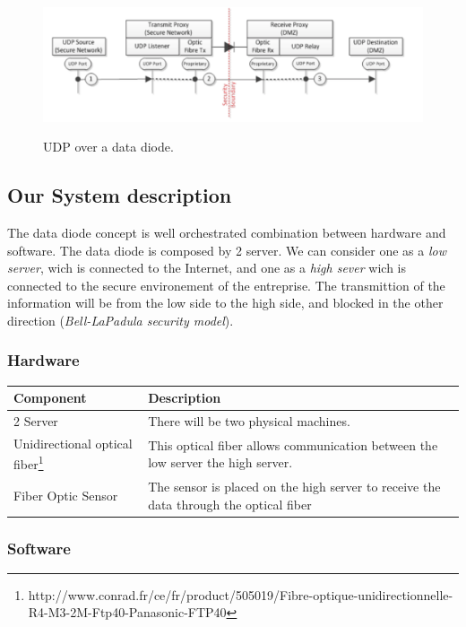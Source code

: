 \documentclass[a4paper,10pt]{article}
\begin{document}
 
\begin{figure}
\centering
\includegraphics[scale=0.5]{images/UDPOverDD.png}
\label{fig:UDPDD}
\caption{UDP over a data diode.}
\end{figure}


\subsection{Our System description}
The data diode concept is well orchestrated combination between hardware and software. The data diode is composed by 2 server. We can consider one as a \textit{low server}, wich is connected to the Internet, and one as a \textit{high sever} wich is connected to the secure environement of the entreprise. 
The transmittion of the information will be from the low side to the high side, and blocked in the other direction (\textit{Bell-LaPadula security model}).

\subsubsection{Hardware}

\begin{tabular}{|p{3cm}|p{10.5cm}|}
	\hline
	\textbf{Component} & \textbf{Description}                 \\
	\hline
	2 Server  & There will be two physical machines. \\
	\hline
	Unidirectional optical fiber\footnote{http://www.conrad.fr/ce/fr/product/505019/Fibre-optique-unidirectionnelle-R4-M3-2M-Ftp40-Panasonic-FTP40} & This optical fiber allows communication between the low server the high server.                    \\
	\hline
	Fiber Optic Sensor & The sensor is placed on the high server to receive the data through the optical fiber \\
	\hline
\end{tabular}

\subsubsection{Software}
\end{document}
